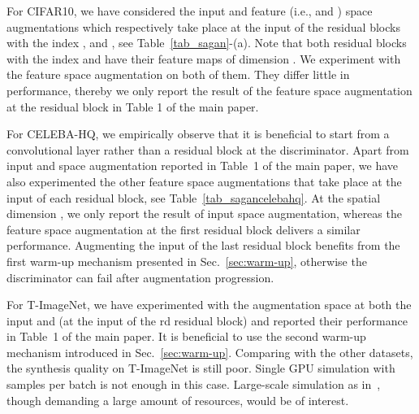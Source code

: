 \documentclass{article}
\begin{document}
\begin{center}
For CIFAR10, we have considered the input and feature (i.e.,  and ) space augmentations which respectively take place at the input of the residual blocks with the index ,  and , see Table~\ref{tab_sagan}-(a). Note that both residual blocks with the index  and  have their feature maps of dimension . We experiment with the feature space augmentation on both of them. They differ little in performance, thereby we only report the result of the feature space augmentation at the residual block  in Table 1 of the main paper.

For CELEBA-HQ, we empirically observe that it is beneficial to start from a convolutional layer rather than a residual block at the discriminator. Apart from input and  space augmentation reported in Table~1 of the main paper, we have also experimented the other feature space augmentations that take place at the input of each residual block, see Table~\ref{tab_sagancelebahq}. At the spatial dimension , we only report the result of input space augmentation, whereas the feature space augmentation at the first residual block delivers a similar performance. Augmenting the input of the last residual block benefits from the first warm-up mechanism presented in Sec.~\ref{sec:warm-up}, otherwise the discriminator can fail after augmentation progression.

For T-ImageNet, we have experimented with the augmentation space at both the input and  (at the input of the rd residual block) and reported their performance in Table~1 of the main paper. It is beneficial to use the second warm-up mechanism introduced in Sec.~\ref{sec:warm-up}. Comparing with the other datasets, the synthesis quality on T-ImageNet is still poor. Single GPU simulation with  samples per batch is not enough in this case. Large-scale simulation as in~\cite{Brock2019}, though demanding a large amount of resources, would be of interest.





\end{center}
\end{document}
